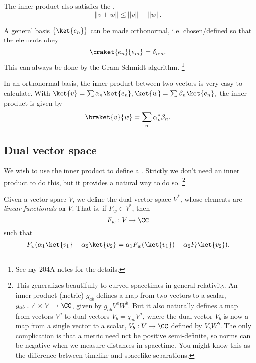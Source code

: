 The inner product also satisfies the ,
\begin{equation}
    ||v+w||\leq ||v|| + ||w||.
\end{equation}

A general basis $\set{\ket{e_n}}$ can be made orthonormal, i.e. chosen/defined so that the elements obey
\begin{equation}
    \braket{e_n}{e_m} = \delta_{nm}.
\end{equation}
This can always be done by the Gram-Schmidt algorithm.%
    \footnote{See my 204A notes for the details.}

In an orthonormal basis, the inner product between two vectors is very easy to calculate. With $\ket{v}=\sum \alpha_n \ket{e_n}, \ket{w} =\sum \beta_n \ket{e_n},$ the inner product is given by
\begin{equation}
    \braket{v}{w}=\sum_n \alpha_n^* \beta_n.
\end{equation}

\subsection*{Dual vector space}
We wish to use the inner product to define a . Strictly we don't need an inner product to do this, but it provides a natural way to do so.%
    \footnote{This generalizes beautifully to curved spacetimes in general relativity. An inner product (metric) $g_{ab}$ defines a map from two vectors to a scalar, $g_{ab}:V\times V \to \CC$, given by $g_{ab}V^a W^b$. But it also naturally defines a map from vectors $V^a$ to dual vectors $V_b = g_{ab} V^a$, where the dual vector $V_b$ is now a map from a single vector to a scalar, $V_b: V \to \CC$ defined by $V_b W^b$. The only complication is that a metric need not be positive semi-definite, so norms can be negative when we measure distances in spacetime. You might know this as the difference between timelike and spacelike separations.}
\begin{defn}
    Given a vector space $V$, we define the dual vector space $V^*$, whose elements are \emph{linear functionals} on $V$. That is, if $F_w \in V^*$, then
    \begin{equation}
        F_w:V\to \CC
    \end{equation}
    such that
    \begin{equation}
        F_w(\alpha_1 \ket{v_1} + \alpha_2 \ket{v_2}=\alpha_1 F_w (\ket{v_1}) +\alpha_2 F_ (\ket{v_2}).
    \end{equation}
\end{defn}

